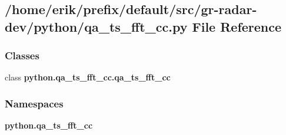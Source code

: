 \subsection{/home/erik/prefix/default/src/gr-\/radar-\/dev/python/qa\+\_\+ts\+\_\+fft\+\_\+cc.py File Reference}
\label{qa__ts__fft__cc_8py}
\subsubsection*{Classes}
\begin{DoxyCompactItemize}
\item 
class {\bf python.\+qa\+\_\+ts\+\_\+fft\+\_\+cc.\+qa\+\_\+ts\+\_\+fft\+\_\+cc}
\end{DoxyCompactItemize}
\subsubsection*{Namespaces}
\begin{DoxyCompactItemize}
\item 
 {\bf python.\+qa\+\_\+ts\+\_\+fft\+\_\+cc}
\end{DoxyCompactItemize}
